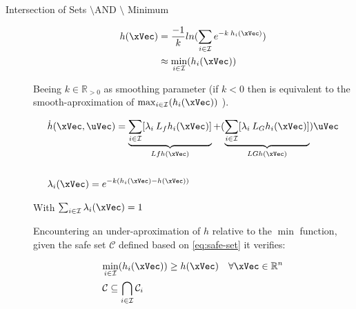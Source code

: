 \begin{description}

    \item[Intersection of Sets \(\setminus\)AND \(\setminus\) Minimum]

    \begin{align}
        h(\xVec) &= \frac{-1}{k}ln(\sum_{i \in \mathcal{I}} e^{-k \hspace{0.2em} h_i(\xVec)}) 
        \label{eq:Min_smoothFunc} \\
                 &\approx \underset{i \in \mathcal{I}}{\min} (h_i(\xVec))
        \notag  
    \end{align}

    Beeing \(k \in \mathbb{R}_{>0}\) as smoothing parameter (if \(k<0\) then is equivalent to the smooth-aproximation of \(\max_{i \in \mathcal{I}}(h_i(\xVec))\) ). 

    \begin{subequations}
        \begin{align}
            &\dot{h}(\xVec , \uVec) = \underbrace{\sum_{i \in \mathcal{I}} [\lambda_i \hspace{0.2em} L_fh_i(\xVec)]}_{Lfh(\xVec)} + (\underbrace{\sum_{i \in \mathcal{I}} [\lambda_i \hspace{0.2em} L_Gh_i(\xVec)]}_{LGh(\xVec)})\uVec 
            \label{eq:Min_smooth_derivative} \\ \notag \\
            &\lambda_i(\xVec) = e^{-k(h_i(\xVec)-h(\xVec))}
            \label{eq:Min_lambda_smoothFunc}
        \end{align}
    \end{subequations}

    With \(\sum_{i \in \mathcal{I}} \lambda_i(\xVec) = 1\) \par
    Encountering an under-aproximation of \(h\) relative to the \(\min\) function, given the safe set \(\mathcal{C}\) defined based on \ref{eq:safe-set} it verifies:

    \begin{subequations}
        \begin{align}
            &\underset{i \in \mathcal{I}}{\min} (h_i(\xVec)) \geq h(\xVec) \quad \forall \xVec \in \mathbb{R}^n 
            \label{eq:Intersection_CBF_Comparation} \\
            &\mathcal{C} \subseteq \bigcap_{i \in \mathcal{I}} \mathcal{C}_i
            \label{eq:Intersection_SafeSet_Comparation}
        \end{align}
    \end{subequations}


\end{description}
